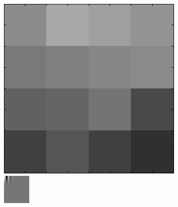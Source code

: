 \begin{figure}[ht]
 \includegraphics[width=\textwidth*11/100]{ch5/figures/XM2VTS_8_3.png}\\
 \includegraphics[width=\textwidth*11/100]{ch5/figures/firstgabor_Scaling_1.png}

\end{figure}
